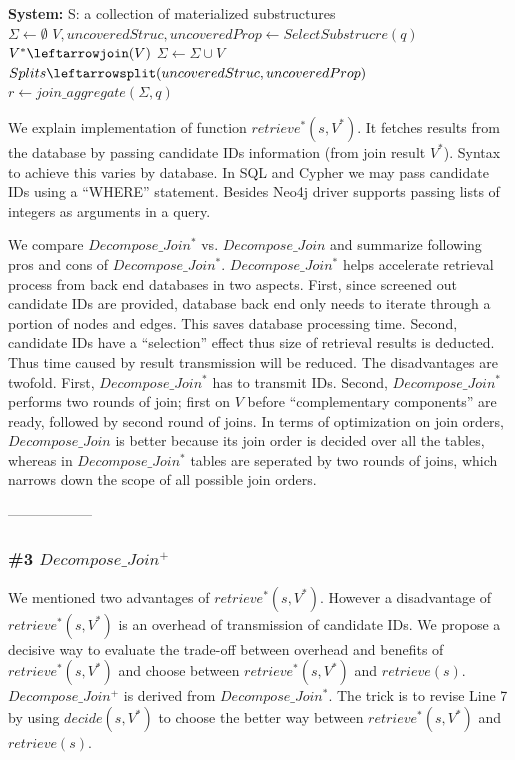 \begin{algorithm}[H]
\caption{$Decompose\_Join^{*}$}
\LinesNumbered
\textbf{System:} S: a collection of materialized substructures\\
$\Sigma \gets \emptyset $\;
$V, uncoveredStruc, uncoveredProp \gets SelectSubstrucre(q) $\;
$V^{*}\leftarrowjoin(V)$\;
$\Sigma \gets \Sigma \cup V $\;
$Splits\leftarrowsplit(uncoveredStruc, uncoveredProp)$\;
$r \leftarrow join\_aggregate(\Sigma, q)$\;
\end{algorithm}


We explain implementation of function $retrieve^{*}(s, V^{*})$. It fetches results from the database by passing candidate IDs information (from join result $V^{*}$). Syntax to achieve this varies by database. In SQL and Cypher we may pass candidate IDs using a ``WHERE'' statement. Besides Neo4j driver supports passing lists of integers as arguments in a query.


We compare $Decompose\_Join^{*}$ vs.  $Decompose\_Join$ and summarize following pros and cons of $Decompose\_Join^{*}$. $Decompose\_Join^{*}$ helps accelerate retrieval process from back end databases in two aspects. First, since screened out candidate IDs are provided, database back end only needs to iterate through a portion of nodes and edges. This saves database processing time. Second, candidate IDs have a ``selection'' effect thus size of retrieval results is deducted. Thus time caused by result transmission will be reduced. The disadvantages are twofold. First, $Decompose\_Join^{*}$ has to transmit IDs. Second,  $Decompose\_Join^{*}$ performs two rounds of join; first on $V$ before ``complementary components'' are ready,  followed by second round of joins. In terms of optimization on join orders, $Decompose\_Join$ is better because its join order is decided over all the tables, whereas in $Decompose\_Join^{*}$ tables are seperated by two rounds of joins, which narrows down the scope of all possible join orders.

------------------
\subsubsection{\#3 $Decompose\_Join^{+}$}
We mentioned two advantages of $retrieve^{*}(s, V^{*})$. However a disadvantage of $retrieve^{*}(s, V^{*})$ is an overhead of transmission of candidate IDs. We propose a decisive way to evaluate the trade-off between overhead and benefits of $retrieve^{*}(s, V^{*})$ and choose between $retrieve^{*}(s, V^{*})$ and $retrieve(s)$. $Decompose\_Join^{+}$ is derived from $Decompose\_Join^{*}$. The trick is to revise Line 7 by using $decide(s,V^{*})$ to choose the better way between $retrieve^{*}(s, V^{*})$ and $retrieve(s)$.

